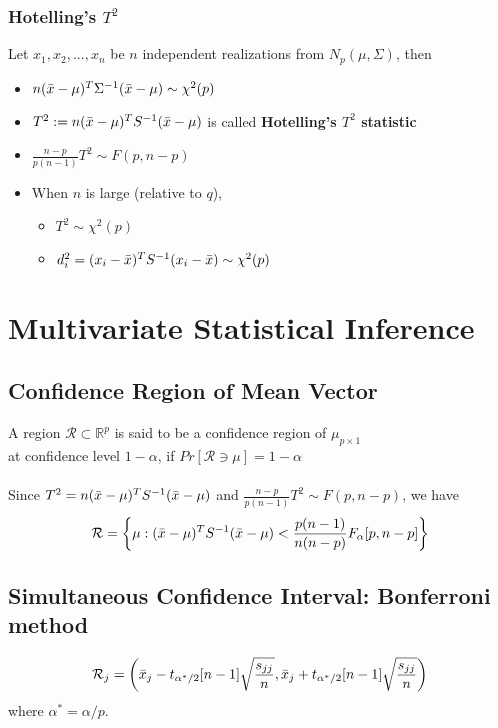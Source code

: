 \documentclass[12pt]{extarticle}
\newcommand{\<}{\langle}
\renewcommand{\>}{\rangle}
\theoremstyle{definition}
\begin{document}
\subsubsection{Hotelling's $T^2$}
Let $x_1, x_2, ..., x_n$ be $n$ independent realizations from $N_p(\mu, \Sigma)$, then
\begin{itemize}
    \item $n(\Bar{x}-\mu)^T \Sigma^{-1} (\Bar{x}-\mu) \sim \chi^2 (p)$ \\
    \item $T^2 := n(\Bar{x}-\mu)^T S^{-1} (\Bar{x}-\mu)$ is called \textbf{Hotelling's $T^2$ statistic} \\
    \item $\frac{n-p}{p(n-1)} T^2 \sim F(p, n-p)$ \\
    \item When $n$ is large (relative to $q$),
    \begin{itemize}
        \item $T^2 \sim \chi^2 (p)$ \\
        \item $d_i^2 = (x_i - \Bar{x})^T S^{-1} (x_i - \Bar{x}) \sim \chi^2 (p)$
    \end{itemize}
\end{itemize}

\newpage
\section{Multivariate Statistical Inference}
\subsection{Confidence Region of Mean Vector}
A region $\mathcal{R} \subset \mathbb{R}^p$ is said to be a confidence region of $\mu_{p \times 1}$ \\
at confidence level $1-\alpha$, if $Pr[\mathcal{R} \owns \mu] = 1-\alpha$ \\
\ \\ 
Since $T^2 = n(\Bar{x}-\mu)^T S^{-1} (\Bar{x}-\mu)$ and $\frac{n-p}{p(n-1)}T^2 \sim F(p, n-p)$, we have
\begin{eqnarray*}
\mathcal{R} = \left\{ \mu : (\Bar{x}-\mu)^T S^{-1} (\Bar{x}-\mu) < \frac{p(n-1)}{n(n-p)}F_{\alpha}[p, n-p] \right\}
\end{eqnarray*}

\subsection{Simultaneous Confidence Interval: Bonferroni method}
\begin{eqnarray*}
\mathcal{R}_j = \left( \Bar{x}_j - t_{\alpha^*/2}[n-1] \sqrt{\frac{s_{jj}}{n}}, \Bar{x}_j + t_{\alpha^*/2}[n-1] \sqrt{\frac{s_{jj}}{n}} \right)
\end{eqnarray*}
where $\alpha^* = \alpha/p$. \\
\end{document}
